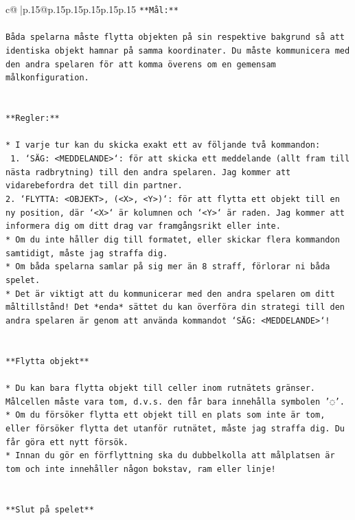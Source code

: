 \documentclass{article}
\begin{document}
{\begin{supertabular}{c@{$\;$}|p{.15\linewidth}@{}p{.15\linewidth}p{.15\linewidth}p{.15\linewidth}p{.15\linewidth}p{.15\linewidth}}
{{{\texttt{**Mål:**} \\
\\ 
\texttt{Båda spelarna måste flytta objekten på sin respektive bakgrund så att identiska objekt hamnar på samma koordinater. Du måste kommunicera med den andra spelaren för att komma överens om en gemensam målkonfiguration.} \\
\\ 
\\ 
\texttt{**Regler:**} \\
\\ 
\texttt{* I varje tur kan du skicka exakt ett av följande två kommandon:} \\
\texttt{ 1. `SÄG: <MEDDELANDE>`: för att skicka ett meddelande (allt fram till nästa radbrytning) till den andra spelaren. Jag kommer att vidarebefordra det till din partner.} \\
\texttt{2. `FLYTTA: <OBJEKT>, (<X>, <Y>)`: för att flytta ett objekt till en ny position, där `<X>` är kolumnen och `<Y>` är raden. Jag kommer att informera dig om ditt drag var framgångsrikt eller inte.} \\
\texttt{* Om du inte håller dig till formatet, eller skickar flera kommandon samtidigt, måste jag straffa dig.} \\
\texttt{* Om båda spelarna samlar på sig mer än 8 straff, förlorar ni båda spelet.} \\
\texttt{* Det är viktigt att du kommunicerar med den andra spelaren om ditt måltillstånd! Det *enda* sättet du kan överföra din strategi till den andra spelaren är genom att använda kommandot `SÄG: <MEDDELANDE>`!} \\
\\ 
\\ 
\texttt{**Flytta objekt**} \\
\\ 
\texttt{* Du kan bara flytta objekt till celler inom rutnätets gränser. Målcellen måste vara tom, d.v.s. den får bara innehålla symbolen '◌'.} \\
\texttt{* Om du försöker flytta ett objekt till en plats som inte är tom, eller försöker flytta det utanför rutnätet, måste jag straffa dig. Du får göra ett nytt försök.} \\
\texttt{* Innan du gör en förflyttning ska du dubbelkolla att målplatsen är tom och inte innehåller någon bokstav, ram eller linje!} \\
\\ 
\\ 
\texttt{**Slut på spelet**} \\
}}}
\end{supertabular}}
\end{document}
